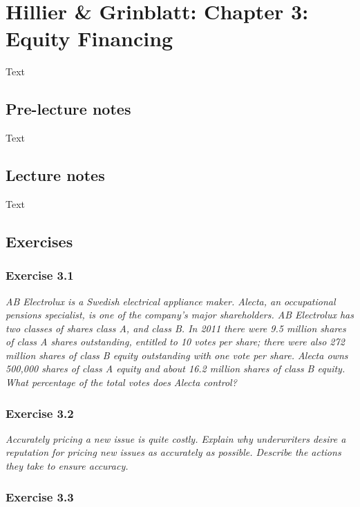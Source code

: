 \documentclass[]{book}
\theoremstyle{definition}
\theoremstyle{definition}
\theoremstyle{remark}
\begin{document}
\chapter{Hillier \& Grinblatt: Chapter 3: Equity
Financing}\label{hillier-grinblatt-chapter-3-equity-financing}

Text

\section{Pre-lecture notes}\label{pre-lecture-notes-2}

Text

\section{Lecture notes}\label{lecture-notes-2}

Text

\section{Exercises}\label{exercises-2}

\subsection{Exercise 3.1}\label{exercise-3.1}

\emph{AB Electrolux is a Swedish electrical appliance maker. Alecta, an
occupational pensions specialist, is one of the company's major
shareholders. AB Electrolux has two classes of shares class A, and class
B. In 2011 there were 9.5 million shares of class A shares outstanding,
entitled to 10 votes per share; there were also 272 million shares of
class B equity outstanding with one vote per share. Alecta owns 500,000
shares of class A equity and about 16.2 million shares of class B
equity. What percentage of the total votes does Alecta control?}
\citep[p.76]{book}

\subsection{Exercise 3.2}\label{exercise-3.2}

\emph{Accurately pricing a new issue is quite costly. Explain why
underwriters desire a reputation for pricing new issues as accurately as
possible. Describe the actions they take to ensure accuracy.}
\citep[p.76]{book}

\subsection{Exercise 3.3}\label{exercise-3.3}
\end{document}
